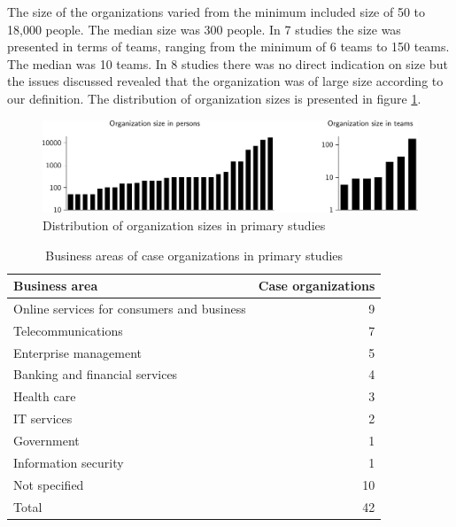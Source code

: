 The size of the organizations varied from the minimum included size of 50 to
18,000 people. The median size was 300 people. In 7 studies the size was
presented in terms of teams, ranging from the minimum of 6 teams to 150 teams.
The median was 10 teams. In 8 studies there was no direct indication on size
but the issues discussed revealed that the organization was of large size
according to our definition. The distribution of organization sizes is presented
in figure \ref{fig:organization_size}.

\begin{figure}[!t]
  \begin{center}
    \includegraphics[width=1\textwidth]{graphics/organization_size.pdf}
    \caption{Distribution of organization sizes in primary studies}
    \label{fig:organization_size}
  \end{center}
\end{figure}

\begin{table}[!t]
    \centering
    \begin{tabular}{ l r }
        \toprule
        Business area    &  Case organizations   \\
        \midrule
		Online services for consumers and business  &  9  \\
		Telecommunications                          &  7  \\
		Enterprise management                       &  5  \\
		Banking and financial services              &  4  \\
		Health care                                  &  3  \\
		IT services                                 &  2  \\
		Government                                  &  1  \\
		Information security                        &  1  \\
		Not specified                               & 10  \\
        \midrule
		Total                                       & 42  \\
        \bottomrule
    \end{tabular}
    \caption{Business areas of case organizations in primary studies}
    \label{table:businessareas}
\end{table}

